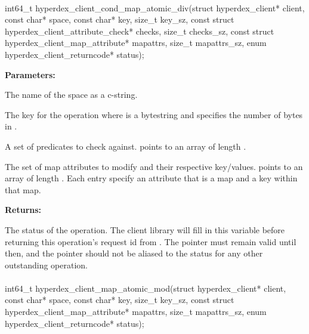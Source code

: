 \paragraph{}
\label{api:c:cond_map_atomic_div}
\begin{ccode}
int64_t hyperdex_client_cond_map_atomic_div(struct hyperdex_client* client,
        const char* space,
        const char* key, size_t key_sz,
        const struct hyperdex_client_attribute_check* checks, size_t checks_sz,
        const struct hyperdex_client_map_attribute* mapattrs, size_t mapattrs_sz,
        enum hyperdex_client_returncode* status);
\end{ccode}
\funcdesc 

\noindent\textbf{Parameters:}
\begin{description}[labelindent=\widthof{{\code{mapattrs}, \code{mapattrs\_sz}}},leftmargin=*,noitemsep,nolistsep,align=right]
\item[\code{space}] The name of the space as a c-string.
\item[\code{key}, \code{key\_sz}] The key for the operation where  is a bytestring and  specifies the number of bytes in .
\item[\code{checks}, \code{checks\_sz}] A set of predicates to check against.   points to an array of length .
\item[\code{mapattrs}, \code{mapattrs\_sz}] The set of map attributes to modify and their respective key/values.   points to an array of length .  Each entry specify an attribute that is a map and a key within that map.
\end{description}

\noindent\textbf{Returns:}
\begin{description}[labelindent=\widthof{{\code{status}}},leftmargin=*,noitemsep,nolistsep,align=right]
\item[\code{status}] The status of the operation.  The client library will fill in this variable before returning this operation's request id from .  The pointer must remain valid until then, and the pointer should not be aliased to the status for any other outstanding operation.
\end{description}

\paragraph{}
\label{api:c:map_atomic_mod}
\begin{ccode}
int64_t hyperdex_client_map_atomic_mod(struct hyperdex_client* client,
        const char* space,
        const char* key, size_t key_sz,
        const struct hyperdex_client_map_attribute* mapattrs, size_t mapattrs_sz,
        enum hyperdex_client_returncode* status);
\end{ccode}
\funcdesc 

